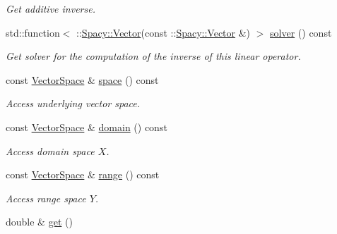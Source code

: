 \begin{DoxyCompactItemize}
\begin{DoxyCompactList}\small\item\em Get additive inverse. \end{DoxyCompactList}\item 
std\+::function$<$ \+::\hyperlink{classSpacy_1_1Vector}{Spacy\+::\+Vector}(const \+::\hyperlink{classSpacy_1_1Vector}{Spacy\+::\+Vector} \&) $>$ \hyperlink{structSpacy_1_1Scalar_1_1LinearOperator_aa4b25737fbff5a431545ae5076e2c0c0}{solver} () const \hypertarget{structSpacy_1_1Scalar_1_1LinearOperator_aa4b25737fbff5a431545ae5076e2c0c0}{}\label{structSpacy_1_1Scalar_1_1LinearOperator_aa4b25737fbff5a431545ae5076e2c0c0}

\begin{DoxyCompactList}\small\item\em Get solver for the computation of the inverse of this linear operator. \end{DoxyCompactList}\item 
const \hyperlink{classSpacy_1_1VectorSpace}{Vector\+Space} \& \hyperlink{classSpacy_1_1VectorBase_aa999dbf9d679d895dfe04c10fbf9f5e9}{space} () const \hypertarget{classSpacy_1_1VectorBase_aa999dbf9d679d895dfe04c10fbf9f5e9}{}\label{classSpacy_1_1VectorBase_aa999dbf9d679d895dfe04c10fbf9f5e9}

\begin{DoxyCompactList}\small\item\em Access underlying vector space. \end{DoxyCompactList}\item 
const \hyperlink{classSpacy_1_1VectorSpace}{Vector\+Space} \& \hyperlink{classSpacy_1_1OperatorBase_a2588f9b3e0188820c4c494e63293dc6f}{domain} () const \hypertarget{classSpacy_1_1OperatorBase_a2588f9b3e0188820c4c494e63293dc6f}{}\label{classSpacy_1_1OperatorBase_a2588f9b3e0188820c4c494e63293dc6f}

\begin{DoxyCompactList}\small\item\em Access domain space $X$. \end{DoxyCompactList}\item 
const \hyperlink{classSpacy_1_1VectorSpace}{Vector\+Space} \& \hyperlink{classSpacy_1_1OperatorBase_ab19d3b7a6f290b1079248f1e567e53d6}{range} () const \hypertarget{classSpacy_1_1OperatorBase_ab19d3b7a6f290b1079248f1e567e53d6}{}\label{classSpacy_1_1OperatorBase_ab19d3b7a6f290b1079248f1e567e53d6}

\begin{DoxyCompactList}\small\item\em Access range space $Y$. \end{DoxyCompactList}\item 
double \& \hyperlink{classSpacy_1_1Mixin_1_1Get_aaa3afedcb9b9e943f81d1686b70417db}{get} ()\hypertarget{classSpacy_1_1Mixin_1_1Get_aaa3afedcb9b9e943f81d1686b70417db}{}\label{classSpacy_1_1Mixin_1_1Get_aaa3afedcb9b9e943f81d1686b70417db}


\end{DoxyCompactItemize}
